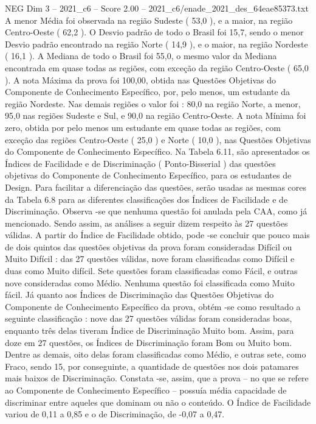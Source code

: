 \begin{textsample}{NEG Dim 3 – 2021\_c6 – Score 2.00 – 2021\_c6/enade\_2021\_des\_64eae85373.txt}
A menor Média foi observada na região Sudeste ( 53,0 ), e a maior, na região Centro-Oeste ( 62,2 ).
O Desvio padrão de todo o Brasil foi 15,7, sendo o menor Desvio padrão encontrado na região Norte ( 14,9 ), e o maior, na região Nordeste ( 16,1 ).
A Mediana de todo o Brasil foi 55,0, o mesmo valor da Mediana encontrada em quase todas as regiões, com exceção da região Centro-Oeste ( 65,0 ).
A nota Máxima da prova foi 100,00, obtida nas Questões Objetivas do Componente de Conhecimento Específico, por, pelo menos, um estudante da região Nordeste.
Nas demais regiões o valor foi : 80,0 na região Norte, a menor, 95,0 nas regiões Sudeste e Sul, e 90,0 na região Centro-Oeste.
A nota Mínima foi zero, obtida por pelo menos um estudante em quase todas as regiões, com exceção das regiões Centro-Oeste ( 25,0 ) e Norte ( 10,0 ), nas Questões Objetivas do Componente de Conhecimento Específico.
Na Tabela 6.11, são apresentados os Índices de Facilidade e de Discriminação ( Ponto-Bisserial ) das questões objetivas do Componente de Conhecimento Específico, para os estudantes de Design.
Para facilitar a diferenciação das questões, serão usadas as mesmas cores da Tabela 6.8 para as diferentes classificações dos Índices de Facilidade e de Discriminação.
Observa -se que nenhuma questão foi anulada pela CAA, como já mencionado.
Sendo assim, as análises a seguir dizem respeito às 27 questões válidas.
A partir do Índice de Facilidade obtido, pode -se concluir que pouco mais de dois quintos das questões objetivas da prova foram consideradas Difícil ou Muito Difícil : das 27 questões válidas, nove foram classificadas como Difícil e duas como Muito difícil.
Sete questões foram classificadas como Fácil, e outras nove consideradas como Médio.
Nenhuma questão foi classificada como Muito fácil.
Já quanto aos Índices de Discriminação das Questões Objetivas do Componente de Conhecimento Específico da prova, obtém -se como resultado a seguinte classificação : nove das 27 questões válidas foram consideradas boas, enquanto três delas tiveram Índice de Discriminação Muito bom.
Assim, para doze em 27 questões, os Índices de Discriminação foram Bom ou Muito bom.
Dentre as demais, oito delas foram classificadas como Médio, e outras sete, como Fraco, sendo 15, por conseguinte, a quantidade de questões nos dois patamares mais baixos de Discriminação.
Constata -se, assim, que a prova – no que se refere ao Componente de Conhecimento Específico – possuía média capacidade de discriminar entre aqueles que dominam ou não o conteúdo.
O Índice de Facilidade variou de 0,11 a 0,85 e o de Discriminação, de -0,07 a 0,47.

\end{textsample}
